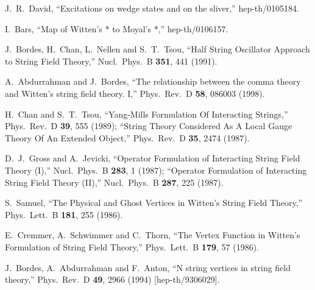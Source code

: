 \documentclass[a4paper,12pt]{article}
\begin{document}
\begin{thebibliography}{999}
J.~R.~David,
``Excitations on wedge states and on the sliver,''
hep-th/0105184.

I.~Bars,
``Map of Witten's * to Moyal's *,''
hep-th/0106157.

J.~Bordes, H.~Chan, L.~Nellen and S.~T.~Tsou,
``Half String Oscillator Approach to String Field Theory,''
Nucl.\ Phys.\ B {\bf 351}, 441 (1991).

A.~Abdurrahman and J.~Bordes,
``The relationship between the comma theory 
and Witten's string field  theory. I,''
Phys.\ Rev.\ D {\bf 58}, 086003 (1998).

H.~Chan and S.~T.~Tsou,
``Yang-Mills Formulation Of Interacting Strings,''
Phys.\ Rev.\ D {\bf 39}, 555 (1989);
``String Theory Considered As A Local Gauge Theory Of An Extended Object,''
Phys.\ Rev.\ D {\bf 35}, 2474 (1987).



D.~J.~Gross and A.~Jevicki,
``Operator Formulation of Interacting String Field Theory (I),''
Nucl.\ Phys.\ B {\bf 283}, 1 (1987);
``Operator Formulation of Interacting String Field Theory (II),''
Nucl.\ Phys.\ B {\bf 287}, 225 (1987).


S.~Samuel,
``The Physical and Ghost Vertices in Witten's String Field Theory,''
Phys.\ Lett.\ B {\bf 181}, 255 (1986).

E.~Cremmer, A.~Schwimmer and C.~Thorn,
``The Vertex Function in Witten's Formulation of String Field Theory,''
Phys.\ Lett.\ B {\bf 179}, 57 (1986).

J.~Bordes, A.~Abdurrahman and F.~Anton,
``N string vertices in string field theory,''
Phys.\ Rev.\ D {\bf 49}, 2966 (1994)
[hep-th/9306029].

\end{thebibliography}
\end{document}
